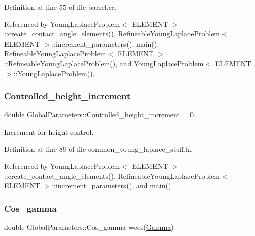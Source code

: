 Definition at line 55 of file barrel.\+cc.



Referenced by Young\+Laplace\+Problem$<$ E\+L\+E\+M\+E\+N\+T $>$\+::create\+\_\+contact\+\_\+angle\+\_\+elements(), Refineable\+Young\+Laplace\+Problem$<$ E\+L\+E\+M\+E\+N\+T $>$\+::increment\+\_\+parameters(), main(), Refineable\+Young\+Laplace\+Problem$<$ E\+L\+E\+M\+E\+N\+T $>$\+::\+Refineable\+Young\+Laplace\+Problem(), and Young\+Laplace\+Problem$<$ E\+L\+E\+M\+E\+N\+T $>$\+::\+Young\+Laplace\+Problem().

\mbox{\label{namespaceGlobalParameters_a65fe7fd6c6c54d7ba89fab47cd4a9141}} 
\subsubsection{\texorpdfstring{Controlled\+\_\+height\+\_\+increment}{Controlled\_height\_increment}}
{\footnotesize\ttfamily double Global\+Parameters\+::\+Controlled\+\_\+height\+\_\+increment = 0.}



Increment for height control. 



Definition at line 89 of file common\+\_\+young\+\_\+laplace\+\_\+stuff.\+h.



Referenced by Young\+Laplace\+Problem$<$ E\+L\+E\+M\+E\+N\+T $>$\+::create\+\_\+contact\+\_\+angle\+\_\+elements(), Refineable\+Young\+Laplace\+Problem$<$ E\+L\+E\+M\+E\+N\+T $>$\+::increment\+\_\+parameters(), and main().

\mbox{\label{namespaceGlobalParameters_ae982fcb894e82c683d07d3c2fbbead3d}} 
\subsubsection{\texorpdfstring{Cos\+\_\+gamma}{Cos\_gamma}}
{\footnotesize\ttfamily double Global\+Parameters\+::\+Cos\+\_\+gamma =cos(\hyperlink{namespaceGlobalParameters_adb0a994119055242fcc762cac5edc317}{Gamma})}



